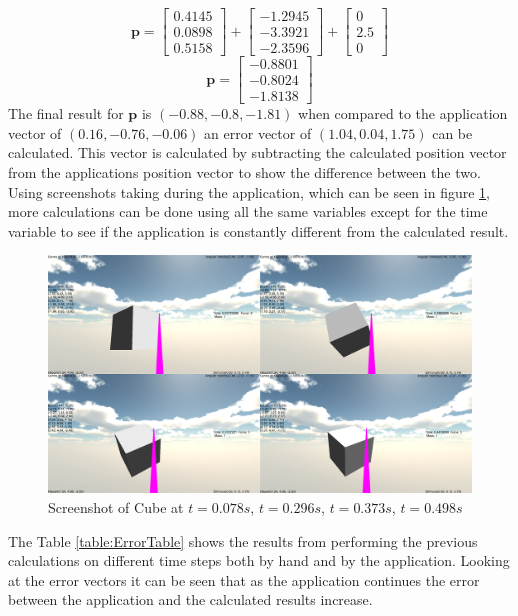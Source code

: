 \begin{equation}\label{eq:working2}
	\mathbf{p}=
	\begin{bmatrix}
		 0.4145  \\
		 0.0898  \\
		 0.5158 
	\end{bmatrix}
	+
	\begin{bmatrix}
		-1.2945 \\
		-3.3921 \\
		-2.3596 
	\end{bmatrix}
	+
	\begin{bmatrix}
		 0 \\
		 2.5 \\
		 0 
	\end{bmatrix}
\end{equation}
\begin{equation}\label{eq:final}
	\mathbf{p}=
	\begin{bmatrix}
		-0.8801 \\
 		-0.8024 \\
 		-1.8138 
	\end{bmatrix}
\end{equation}
The final result for $\mathbf{p}$ is $(-0.88,-0.8,-1.81)$ when compared to the application vector of $(0.16,-0.76,-0.06)$ an error vector of $(1.04,0.04,1.75)$ can be calculated.
This vector is calculated by subtracting the calculated position vector from the applications position vector to show the difference between the two.
Using screenshots taking during the application, which can be seen in figure \ref{fig:ScreenShotFour}, more calculations can be done using all the same variables except for the time variable to see if the application is constantly different from the calculated result.
\begin{figure}[H]
	\centering
	\includegraphics[width=\textwidth]{images/Screenshot1.PNG}
	\caption{Screenshot of Cube at $t = 0.078 s$, $t = 0.296 s$, $t = 0.373 s$, $t = 0.498 s$}
	\label{fig:ScreenShotFour}
\end{figure}
The Table \ref{table:ErrorTable} shows the results from performing the previous calculations on different time steps both by hand and by the application.
Looking at the error vectors it can be seen that as the application continues the error between the application and the calculated results increase.

